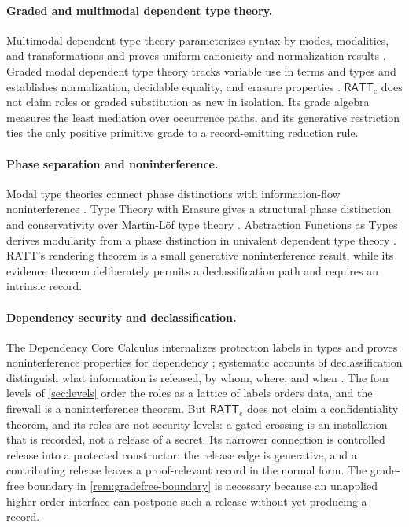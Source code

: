 \documentclass[11pt]{article}
\numberwithin{equation}{section}
\theoremstyle{definition}
\theoremstyle{plain}
\theoremstyle{remark}
\newcommand{\RATT}{\mathsf{RATT}_{\mathrm c}}
\begin{document}
\paragraph{Graded and multimodal dependent type theory.}
Multimodal dependent type theory parameterizes syntax by modes, modalities,
and transformations and proves uniform canonicity and normalization results
\cite{MTT,MTTNorm}.  Graded modal dependent type theory tracks variable use in
terms and types and establishes normalization, decidable equality, and erasure
properties \cite{GradedDTT}.  \(\RATT\) does not claim roles or graded
substitution as new in isolation.  Its grade algebra measures the least
mediation over occurrence paths, and its generative restriction ties the only
positive primitive grade to a record-emitting reduction rule.

\paragraph{Phase separation and noninterference.}
Modal type theories connect phase distinctions with information-flow
noninterference \cite{KavvosIF}.  Type Theory with Erasure gives a structural
phase distinction and conservativity over Martin-L\"of type theory
\cite{TypeTheoryErasure}.  Abstraction Functions as Types derives modularity
from a phase distinction in univalent dependent type theory
\cite{AbstractionFunctions}.  RATT's rendering theorem is a small generative
noninterference result, while its evidence theorem deliberately permits a
declassification path and requires an intrinsic record.

\paragraph{Dependency security and declassification.}
The Dependency Core Calculus internalizes protection labels in types and proves
noninterference properties for dependency \cite{CoreDependency}; systematic
accounts of declassification distinguish what information is released, by
whom, where, and when \cite{Declassification}.  The four levels of
\cref{sec:levels} order the roles as a lattice of labels orders data, and the
firewall is a noninterference theorem.  But \(\RATT\) does not claim a
confidentiality theorem, and its roles are not security levels: a gated
crossing is an installation that is recorded, not a release of a secret.  Its narrower
connection is controlled release into a protected constructor: the release
edge is generative, and a contributing release leaves a proof-relevant record
in the normal form.  The grade-free boundary in
\cref{rem:gradefree-boundary} is necessary because an unapplied higher-order
interface can postpone such a release without yet producing a record.
\end{document}
